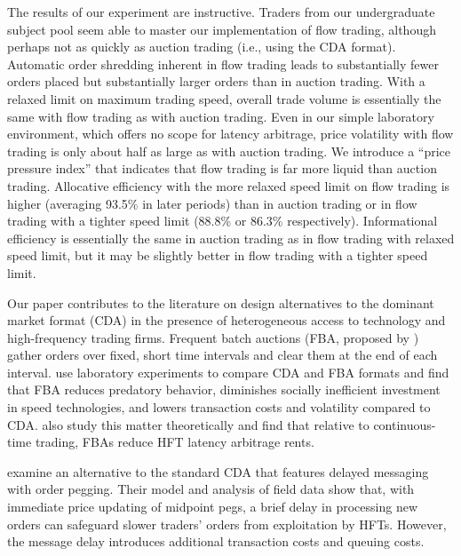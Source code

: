 \documentclass[12pt]{article}
\begin{document}
 
The results of our experiment are instructive. 
Traders from our undergraduate subject pool seem able to master our implementation of flow trading, although perhaps not as quickly as auction trading (i.e., using the CDA format). 
Automatic order shredding inherent in flow trading leads to substantially fewer orders placed but substantially larger orders than in auction trading. 
With a relaxed limit on maximum trading speed, overall trade volume is essentially the same with flow trading as with auction trading.
Even in our simple laboratory environment, which offers no scope for latency arbitrage, price volatility with flow trading is only about half as large as with auction trading. 
We introduce a ``price pressure index'' that indicates that flow trading is far more liquid than auction trading.
Allocative efficiency with the more relaxed speed limit on flow trading is
higher (averaging 93.5\% in later periods)
than in auction trading or in flow trading with a tighter speed limit (88.8\% or 86.3\% respectively). 
Informational efficiency is essentially the same in auction trading as in flow trading with relaxed speed limit, 
but it may be slightly better in flow trading with a tighter speed limit.

 

Our paper contributes to the literature on design alternatives to the dominant market format (CDA) in the presence of heterogeneous access to technology and high-frequency trading firms. 
Frequent batch auctions (FBA, proposed by \citealp{Budish2015}) gather orders over fixed, short time intervals and clear them at the end of each interval. %
\cite{Aldrich2019} use laboratory experiments to
compare CDA and FBA formats %
and find that FBA reduces predatory behavior, diminishes socially inefficient investment in  speed technologies, and lowers transaction costs and volatility compared to CDA. \cite{Haas2021} also study this matter theoretically and find that relative to continuous-time trading, FBAs reduce HFT latency arbitrage rents.

\cite{Aldrich2022} examine an alternative to the standard CDA that features delayed messaging with order pegging.  %
Their model and analysis of field data show that, with immediate price updating of midpoint pegs, a brief delay in processing new orders  can safeguard slower traders' orders from exploitation by HFTs. However, the message delay introduces additional transaction costs and queuing costs. 
\end{document}
